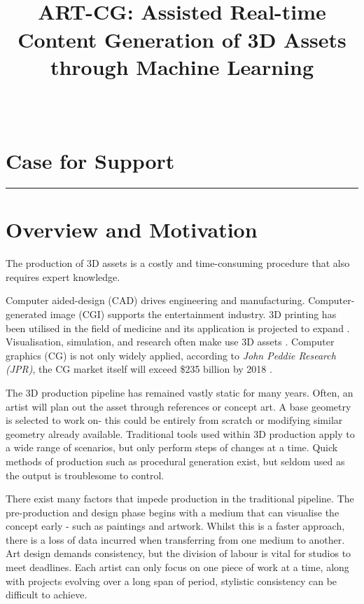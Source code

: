 \documentclass[a4paper, fontsize=15pt, onecolumn]{article} %
\title{
	\vspace{-3.0cm}
	\horrule{0.4pt} \\[0.2cm] %
	\vspace{0.2cm}
	\Large ART-CG: Assisted Real-time Content Generation of 3D Assets through Machine Learning\\
	\horrule{0.4pt} \\[0cm] %
	\vspace{-0.5cm}
}
\date{} %
\numberwithin{equation}{section} %
\numberwithin{figure}{section} %
\numberwithin{table}{section} %
\begin{document}
\maketitle
\thispagestyle{fancy} %

\section*{Case for Support}
\hrule
\section{Overview and Motivation}
The production of 3D assets is a costly and time-consuming procedure that also requires expert knowledge.

Computer aided-design (CAD) drives engineering and manufacturing.
Computer-generated image (CGI) supports the entertainment industry.
3D printing has been utilised in the field of medicine and its application is projected to expand \cite{3dprinting}.
Visualisation, simulation, and research often make use 3D assets \cite{simulation}.
Computer graphics (CG) is not only widely applied, according to \textit{John Peddie Research (JPR)}, the CG market itself will exceed \$235 billion by 2018 \cite{cgmarket}.

The 3D production pipeline has remained vastly static for many years. Often, an artist will plan out the asset through references or concept art. A base geometry is selected to work on- this could be entirely from scratch or modifying similar geometry already available. Traditional tools used within 3D production apply to a wide range of scenarios, but only perform steps of changes at a time. 
Quick methods of production such as procedural generation exist, but seldom used as the output is troublesome to control.

There exist many factors that impede production in the traditional pipeline. The pre-production and design phase begins with a medium that can visualise the concept early - such as paintings and artwork. Whilst this is a faster approach, there is a loss of data incurred when transferring from one medium to another. Art design demands consistency, but the division of labour is vital for studios to meet deadlines. Each artist can only focus on one piece of work at a time, along with projects evolving over a long span of period, stylistic consistency can be difficult to achieve. 
\end{document}
